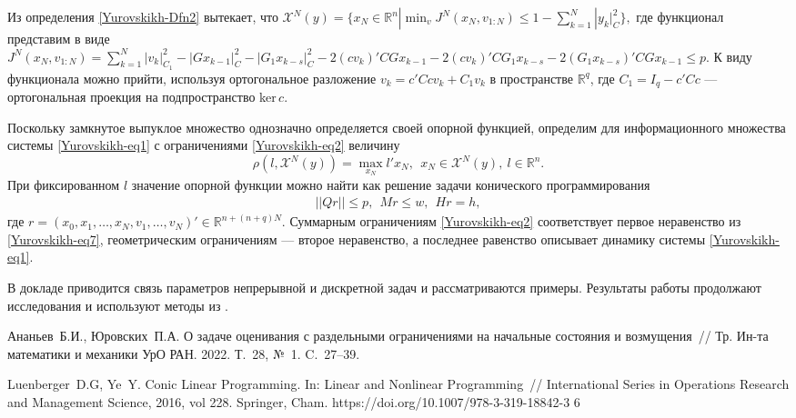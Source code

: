 Из определения \ref{Yurovskikh-Dfn2} вытекает, что
$
	\mathcal{X}^N (y) = \{x_N \in \mathbb{R}^n | \min_v J^N(x_N,v_{1:N})\leq 1 - \sum_{k=1}^N |y_k|^2_C\},
$
где функционал представим в виде $J^N(x_N,v_{1:N}) = \sum_{k=1}^N |v_k|^2_{C_1} -|Gx_{k-1}|^2_C -
 |G_1x_{k-s}|^2_C - 2(cv_k)'CGx_{k-1} - 2(cv_k)'CG_1x_{k-s} - 2(G_1x_{k-s})'CGx_{k-1}  \leq p$. К виду функционала
можно прийти, используя ортогональное разложение $v_k=c'Ccv_k+C_1v_k$ в пространстве
$\mathbb{R}^q$, где $C_1=I_q-c'Cc$ --- ортогональная проекция на подпространство
ker$\,c$.

Поскольку замкнутое выпуклое множество однозначно определяется своей опорной функцией,
определим для  информационного множества системы \eqref{Yurovskikh-eq1} с ограничениями
\eqref{Yurovskikh-eq2} величину
\begin{equation}\label{Yurovskikh-eq5}
	\rho(l,\mathcal{X}^N(y)) = \max_{x_N} l'x_N, \ \ x_N \in \mathcal{X}^N(y), \ l  \in\mathbb{R}^{n}.
\end{equation}
При фиксированном $l$ значение опорной функции можно найти как решение задачи конического
программирования
\begin{equation}\label{Yurovskikh-eq7}
	\begin{gathered}
		||Q r|| \leq p, \ \
		Mr \leq w, \ \
		Hr = h,
	\end{gathered}
\end{equation}
где $r = (x_0, x_1, \dots, x_N, v_1,\dots,v_N )' \in \mathbb{R}^{n+(n+q)N}$. Суммарным
ограничениям \eqref{Yurovskikh-eq2} соответствует первое неравенство из
\eqref{Yurovskikh-eq7}, геометрическим ограничениям --- второе неравенство, а последнее
равенство описывает динамику системы  \eqref{Yurovskikh-eq1}.

В докладе приводится связь параметров непрерывной и дискретной задач и рассматриваются
примеры. Результаты работы продолжают исследования \cite{Yurovskikh-Ananyev} и используют
методы из \cite{Yurovskikh-Luenberger}.

\begin{thebibliography}{9} %
 {   Ананьев~Б.И., Юровских~П.А.} О задаче оценивания с
    раздельными ограничениями на начальные состояния и возмущения~// Тр. Ин-та математики
    и механики УрО РАН. 2022. Т.~28, №~1. C.~27--39.

 {  Luenberger~D.G, Ye~Y.} Conic Linear Programming. In:
    Linear and Nonlinear Prog\-ramming~// International Series in Operations Research and
    Management Science, 2016, vol 228. Springer, Cham.
    https://doi.org/10.1007/978-3-319-18842-3 6
\end{thebibliography}


%
